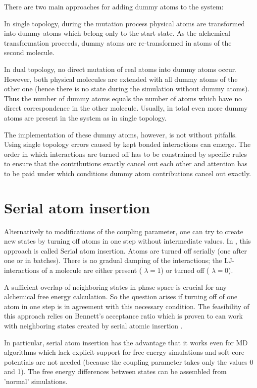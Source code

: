 There are two main approaches for adding dummy atoms to the system: 

In single topology, during the mutation process physical atoms are
transformed into dummy atoms which belong only to the start state.
As the alchemical transformation proceeds, dummy atoms are re-transformed
in atoms of the second molecule.

In dual topology, no direct mutation of real atoms into dummy atoms
occur. However, both physical molecules are extended with all dummy
atoms of the other one (hence there is no state during the simulation
without dummy atoms). Thus the number of dummy atoms equals the number
of atoms which have no direct correspondence in the other molecule.
Usually, in total even more dummy atoms are present in the system
as in single topology. \cite{Fleck.2021}

The implementation of these dummy atoms, however, is not without pitfalls.
Using single topology errors caused by kept bonded interactions can
emerge. The order in which interactions are turned off has to be constrained
by specific rules to ensure that the contributions exactly cancel
out each other and attention has to be paid under which conditions
dummy atom contributions cancel out exactly. \cite{Fleck.2021}

\section{Serial atom insertion}

Alternatively to modifications of the coupling parameter, one can
try to create new states by turning off atoms in one step without
intermediate values. In \cite{Boresch.2011}, this approach is called
Serial atom insertion. Atoms are turned off serially (one after one
or in batches). There is no gradual damping of the interactions; the
LJ-interactions of a molecule are either present ( $\lambda=1$) or
turned off ( $\lambda=0$).

A sufficient overlap of neighboring states in phase space is crucial
for any alchemical free energy calculation. So the question arises
if turning off of one atom in one step is in agreement with this necessary
condition. The feasibility of this approach relies on Bennett's acceptance
ratio which is proven to can work with neighboring states created
by serial atomic insertion \cite{Boresch.2011}.

In particular, serial atom insertion has the advantage that it works
even for MD algorithms which lack explicit support for free energy
simulations and soft-core potentials are not needed (because the coupling
parameter takes only the values 0 and 1). The free energy differences
between states can be assembled from 'normal' simulations.

